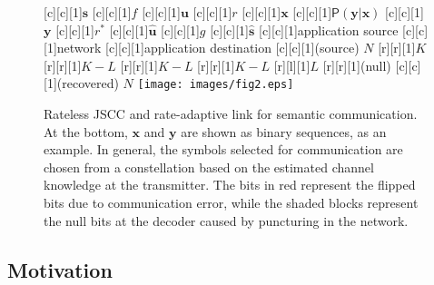 


\begin{figure*}[ht]
\begin{center}
[c][c][1]{$\mathbf{s}$}
[c][c][1]{$f$}
[c][c][1]{$\mathbf{u}$}
[c][c][1]{$r$}
[c][c][1]{$\mathbf{x}$}
[c][c][1]{$\mathsf{P}(\mathbf{y}|\mathbf{x})$}
[c][c][1]{$\mathbf{y}$}
[c][c][1]{$r^{*}$}
[c][c][1]{$\hat{\mathbf{u}}$}
[c][c][1]{$g$}
[c][c][1]{$\hat{\mathbf{s}}$}
[c][c][1]{application source}
[c][c][1]{network}
[c][c][1]{application destination}
[c][c][1]{(source) $N$}
[r][r][1]{$K$}
[r][r][1]{$K-L$}
[r][r][1]{$K-L$}
[r][r][1]{$K-L$}
[r][l][1]{$L$}
[r][r][1]{(null)}
[c][c][1]{(recovered) $N$}
\texttt{[image: images/fig2.eps]}
\caption{Rateless JSCC and rate-adaptive link for semantic communication. At the bottom, $\mathbf{x}$ and $\mathbf{y}$ are shown as binary sequences, as an example. In general, the symbols selected for communication are chosen from a constellation based on the estimated channel knowledge at the transmitter. The bits in red represent the flipped bits due to communication error, while the shaded blocks represent the null bits at the decoder caused by puncturing in the network.}
\label{fig:system-model}
\end{center}
\end{figure*}

\subsection{Motivation}




